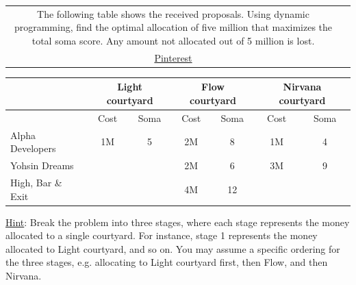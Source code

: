 \documentclass[addpoints]{exam}
\begin{document}
\begin{questions}
\begin{tabularx}{\textwidth}{cX}
    The following table shows the received proposals. Using dynamic programming, find the optimal allocation of five million that maximizes the total soma score. Any amount not allocated out of 5 million is lost.
    \\
    \href{https://ar.pinterest.com/pin/296745062922984411/}{Pinterest}
  \end{tabularx}

  \begin{center}
    \begin{tabular}{|l|*{6}{c|}}
      \hline
      & \multicolumn{2}{|c|}{Light courtyard} & \multicolumn{2}{|c|}{Flow courtyard} & \multicolumn{2}{|c|}{Nirvana courtyard} \\\hline
      &Cost& Soma & Cost & Soma & Cost& Soma \\\hline\hline
      Alpha Developers & 1M & 5 & 2M & 8 & 1M & 4 \\\hline
      Yohsin Dreams &  &  & 2M & 6 & 3M & 9 \\\hline
      High, Bar \& Exit  &  &  & 4M & 12 &  &  \\\hline
    \end{tabular}
  \end{center}  
  \noindent\underline{Hint}: Break the problem into three stages, where each stage represents the money allocated to a single courtyard. For instance, stage 1 represents the money allocated to Light courtyard, and so on. You may assume a specific ordering for the three stages, e.g. allocating to Light courtyard first, then Flow, and then Nirvana. 

  \begin{solution}
    
  \end{solution}


\end{questions}
\end{document}
